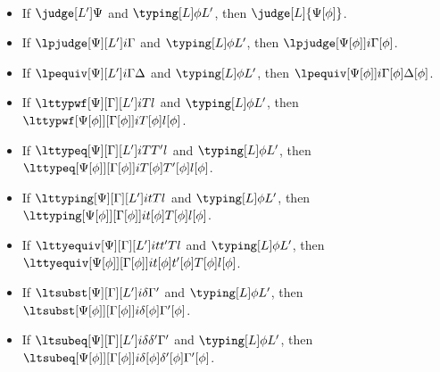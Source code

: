 \begin{lemma} $ $
  \begin{itemize}
  \item If $\judge[L']\Psi$ and $\typing[L]\phi{L'}$, then $\judge[L]{\Psi[\phi]}$.
  \item If $\lpjudge[\Psi][L']i\Gamma$ and $\typing[L]\phi{L'}$, then $\lpjudge[\Psi[\phi]]i{\Gamma[\phi]}$.
  \item If $\lpequiv[\Psi][L']i\Gamma\Delta$ and $\typing[L]\phi{L'}$, then $\lpequiv[\Psi[\phi]]i{\Gamma[\phi]}{\Delta[\phi]}$.
  \item If $\lttypwf[\Psi][\Gamma][L']i T l$ and $\typing[L]\phi{L'}$, then
    $\lttypwf[\Psi[\phi]][\Gamma[\phi]] i{T[\phi]}{l[\phi]}$.
  \item If $\lttypeq[\Psi][\Gamma][L']i T{T'} l$ and $\typing[L]\phi{L'}$, then
    $\lttypeq[\Psi[\phi]][\Gamma[\phi]] i{T[\phi]}{T'[\phi]} {l[\phi]}$.
  \item If $\lttyping[\Psi][\Gamma][L']i t T l$ and $\typing[L]\phi{L'}$, then
    $\lttyping[\Psi[\phi]][\Gamma[\phi]] i{t[\phi]}{T[\phi]} {l[\phi]}$.
  \item If $\lttyequiv[\Psi][\Gamma][L']i t{t'} T l$ and $\typing[L]\phi{L'}$, then
    $\lttyequiv[\Psi[\phi]][\Gamma[\phi]] i{t[\phi]}{t'[\phi]}{T[\phi]} {l[\phi]}$.
  \item If $\ltsubst[\Psi][\Gamma][L'] i{\delta}{\Gamma'}$ and $\typing[L]\phi{L'}$, then
    $\ltsubst[\Psi[\phi]][\Gamma[\phi]] i{\delta[\phi]}{\Gamma'[\phi]}$.
  \item If $\ltsubeq[\Psi][\Gamma][L'] i{\delta}{\delta'}{\Gamma'}$ and $\typing[L]\phi{L'}$, then
    $\ltsubeq[\Psi[\phi]][\Gamma[\phi]] i{\delta[\phi]}{\delta'[\phi]}{\Gamma'[\phi]}$.
  \end{itemize}  
\end{lemma}
